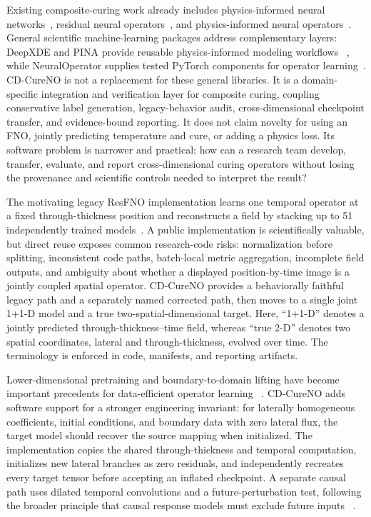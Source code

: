 \documentclass[preprint,12pt]{elsarticle}
\begin{document}
Existing composite-curing work already includes physics-informed neural
networks~\cite{niaki2021pinn}, residual neural operators~\cite{chen2023resfno},
and physics-informed neural operators~\cite{meng2023pino}. General scientific
machine-learning packages address complementary layers: DeepXDE and PINA
provide reusable physics-informed modeling workflows
~\cite{lu2021deepxde,coscia2023pina}, while NeuralOperator supplies tested
PyTorch components for operator learning~\cite{kossaifi2024neuraloperator}.
CD-CureNO is not a replacement for these general libraries. It is a
domain-specific integration and verification layer for composite curing,
coupling conservative label generation, legacy-behavior audit,
cross-dimensional checkpoint transfer, and evidence-bound reporting. It
does not claim novelty for using an FNO, jointly predicting temperature and
cure, or adding a physics loss. Its software problem is narrower and practical:
how can a research team develop, transfer, evaluate, and report
cross-dimensional curing operators without losing the provenance and
scientific controls needed to interpret the result?

The motivating legacy ResFNO implementation learns one temporal operator at a
fixed through-thickness position and reconstructs a field by stacking up to 51
independently trained models~\cite{chen2021resfno,chen2023resfno}. A public
implementation is scientifically valuable, but direct reuse exposes common
research-code risks: normalization before splitting, inconsistent code paths,
batch-local metric aggregation, incomplete field outputs, and ambiguity about
whether a displayed position-by-time image is a jointly coupled spatial
operator. CD-CureNO provides a behaviorally faithful legacy path and a
separately named corrected path, then moves to a single joint 1+1-D model and a
true two-spatial-dimensional target. Here, ``1+1-D'' denotes a jointly
predicted through-thickness--time field, whereas ``true 2-D'' denotes two
spatial coordinates, lateral and through-thickness, evolved over time. The
terminology is enforced in code, manifests, and reporting artifacts.

Lower-dimensional pretraining and boundary-to-domain lifting have become
important precedents for data-efficient operator learning
~\cite{hemmasian2024prelowd,kashi2024lpfno}. CD-CureNO adds software support
for a stronger engineering invariant: for laterally homogeneous coefficients,
initial conditions, and boundary data with zero lateral flux, the target model
should recover the source mapping when initialized. The implementation copies
the shared through-thickness and temporal computation, initializes new lateral
branches as zero residuals, and independently recreates every target tensor
before accepting an inflated checkpoint. A separate causal path uses dilated
temporal convolutions and a future-perturbation test, following the broader
principle that causal response models must exclude future inputs
~\cite{liu2024causal}.
\end{document}
